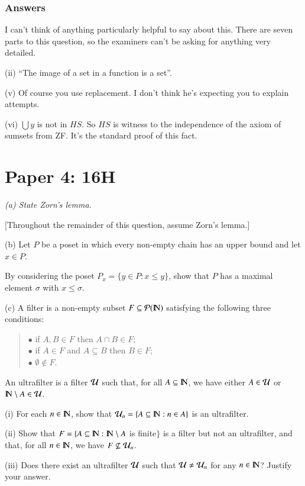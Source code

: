 \documentclass{book}
\begin{document}
\subsubsection*{Answers}

I can't think of anything particularly helpful to say about this.
There are seven parts to this question, so the examiners can't be
asking for anything very detailed.

(ii)  ``The image of a set in a function is a set''.

(v) Of course you use replacement.  I don't think he's expecting you to explain attempts.

(vi) $\bigcup y$ is not in $HS$.  So $HS$ is witness to the
independence of the axiom of sumsets from ZF.  It's the standard proof
of this fact.

\section*{Paper 4: 16H}

{\sl (a) State Zorn's lemma.

[Throughout the remainder of this question, assume Zorn's lemma.]

(b) Let $P$ be a poset in which every non-empty chain has an upper
bound and let $x\in P$.

By considering the poset $P_x=\{y \in P :x \leq y\}$, show that $P$
has a maximal element $\sigma$ with $x\leq\sigma$.

(c) A filter is a non-empty subset $F \subseteq {\cal P}(\hbox{\rm I\negthinspace N})$
  satisfying the following three conditions:\begin{quote}
  $\bullet$ if $A,B \in F$ then $A\cap B \in F$;\\
  $\bullet$ if $A \in F$ and $A \subseteq B$ then $B\in F$;\\
$\bullet$ $\emptyset\not\in F$.
\end{quote}
An ultrafilter is a filter ${\cal U}$ such that, for all $A \subseteq \hbox{\rm I\negthinspace N}$, we
have either $A \in {\cal U}$ or $\hbox{\rm I\negthinspace N}\setminus A \in {\cal U}$.

(i) For each $n\in \hbox{\rm I\negthinspace N}$, show that ${\cal U}_n= \{A \subseteq \hbox{\rm I\negthinspace N} : n \in A\}$
is an ultrafilter.

(ii) Show that $F= \{ A \subseteq \hbox{\rm I\negthinspace N}:\hbox{\rm I\negthinspace N}\setminus A$ is finite$\}$ is
a filter but not an ultrafilter, and that, for all $n\in \hbox{\rm I\negthinspace N}$, we have
$F\not\subseteq{\cal U}_n$.

(iii) Does there exist an ultrafilter ${\cal U}$ such that ${\cal U}\not= {\cal U}_n$
for any $n\in \hbox{\rm I\negthinspace N}$?  Justify your answer.}
\end{document}

